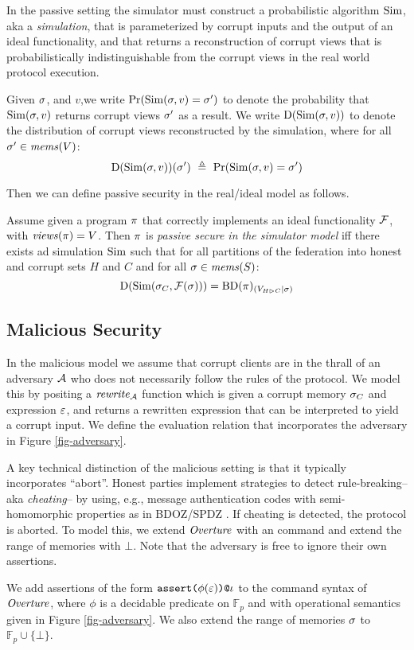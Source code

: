 In the passive setting the simulator must construct a probabilistic
algorithm $\mathrm{Sim}$, aka a \emph{simulation}, that is parameterized by
corrupt inputs and the output of an ideal functionality, and that
returns a reconstruction of corrupt views that is probabilistically
indistinguishable from the corrupt views in the real world protocol
execution.
\begin{definition}
  Given $\sigma$, and $v$,we write $ \mathrm{Pr}(\mathrm{Sim}(\sigma,v) = \sigma') $
  to denote the probability that $\mathrm{Sim}(\sigma,v)$ returns corrupt views
  $\sigma'$ as a result. We write $\mathrm{D}(\mathrm{Sim}(\sigma,v))$ to
  denote the distribution of corrupt views reconstructed by the
  simulation, where for
  all $\sigma' \in \mathit{mems}(V)$:
  $$
  \dist(\SIM(\store,v))(\store')\ \defeq\ \prob(\SIM(\store,v) = \store') 
  $$
\end{definition}
Then we can define passive security in the real/ideal
model as follows. 
\begin{definition}
  Assume given a program $\pi$ that correctly implements an ideal
  functionality $\mathcal{F}$, with $\mathit{views}(\pi) = V$.  Then $\pi$
  is \emph{passive secure in the simulator model} iff there exists
  ad simulation $\mathrm{Sim}$ such that for all
  partitions of the federation into honest and corrupt sets $H$ and $C$
  and for all $\sigma \in \mathit{mems}(S)$:
  $$
  \mathrm{D}(\mathrm{Sim}(\sigma_{C},\mathcal{F}(\sigma))) = \mathrm{BD}(\pi)_{({V_{H \rhd C}}|{\sigma})}
  $$
\end{definition}

\subsection{Malicious Security}

In the malicious model we assume that corrupt clients are in the
thrall of an adversary $\mathcal{A}$ who does not necessarily follow
the rules of the protocol.  We model this by positing a $\mathit{rewrite}_{\mathcal{A}}$
function which is given a corrupt memory $\sigma_C$ and expression
$\varepsilon$, and returns a rewritten expression that can be interpreted to
yield a corrupt input. We define the evaluation relation that
incorporates the adversary in Figure \ref{fig-adversary}.

\adversaryfig

A key technical distinction of the malicious setting is that it
typically incorporates ``abort''. Honest parties implement strategies
to detect rule-breaking-- aka \emph{cheating}-- by using, e.g.,
message authentication codes with semi-homomorphic properties as in
BDOZ/SPDZ \cite{10.1007/978-3-030-68869-1_3}. If cheating is detected,
the protocol is aborted. To model this, we extend $\mathit{Overture}$ with an
 command and extend the range of memories with
$\bot$. Note that the adversary is free to ignore their own
assertions.
\begin{definition}
  We add assertions of the form $\texttt{assert(}\phi(\varepsilon)\texttt{)}\texttt{@}\iota$ to the command
  syntax of $\mathit{Overture}$, where $\phi$ is a decidable predicate on
  $\mathbb{F}_p$ and with operational semantics given in Figure
  \ref{fig-adversary}. We also extend the range of memories $\sigma$
  to $\mathbb{F}_p \cup \{ \bot \}$.
\end{definition}

